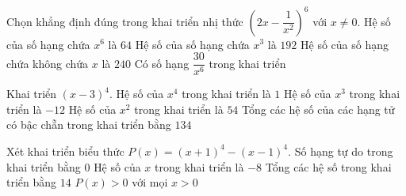 \begin{ex}%
	Chọn khẳng định đúng trong khai  triển nhị thức $\left(2x-\dfrac{1}{x^2}\right)^{6}$ với $x\neq 0$.
	\choiceTF 
		 {\True Hệ số của số hạng chứa $x^6$ là $64$}
		 {Hệ số của số hạng chứa $x^3$ là $192$}
		{\True Hệ số của số hạng chứa không chứa  $x$ là $240$}
		{Có số hạng $\dfrac{30}{x^6}$ trong khai triển} 
\end{ex}

\begin{ex}%
	Khai triển  $(x-3)^4$.
	 \choiceTF
		{\True Hệ số của $x^4$ trong khai triển  là $1$}
		{\True Hệ số của $x^3$  trong khai triển là $-12$}
		{\True Hệ  số của $x^2$ trong khai triển là $54$}
		{Tổng các hệ số của  các hạng tử có bậc chẵn trong khai triển bằng $134$}
\end{ex}

\begin{ex}%
	Xét  khai triển biểu thức $P(x) = (x+1)^4 - (x-1)^4$.
	\choiceTF 
		{\True  Số hạng tự do trong khai triển bằng $0$}
		{Hệ số của $x$ trong  khai triển là $-8$}
		{Tổng các hệ số  trong khai triển bằng $14$}
		 {\True $P(x) > 0$ với mọi $x>0$}
\end{ex}

